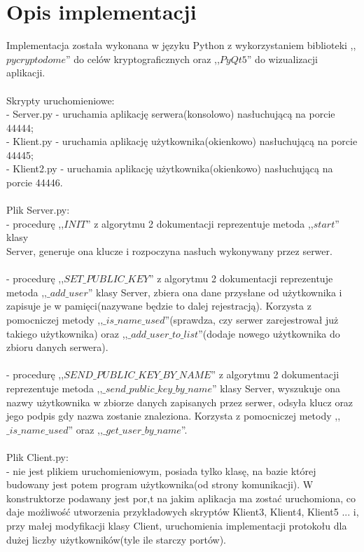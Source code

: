 \documentclass[11pt]{article}
\begin{document}
\clearpage
\section{Opis implementacji}
Implementacja została wykonana w języku Python z wykorzystaniem biblioteki ,,$pycryptodome$'' do celów kryptograficznych oraz ,,$PyQt5$'' do wizualizacji aplikacji.\\\\
Skrypty uruchomieniowe:\\
- Server.py - uruchamia aplikację serwera(konsolowo) nasłuchującą na porcie  44444;\\
- Klient.py - uruchamia aplikację użytkownika(okienkowo) nasłuchującą na porcie 44445;\\
- Klient2.py - uruchamia aplikację użytkownika(okienkowo) nasłuchującą na porcie 44446.\\
\\
Plik Server.py:\\
- procedurę ,,$INIT$'' z algorytmu 2 dokumentacji reprezentuje metoda ,,$start$'' klasy \\Server, generuje ona klucze i rozpoczyna nasłuch wykonywany przez serwer.\\\\
- procedurę ,,$SET\_PUBLIC\_KEY$'' z algorytmu 2 dokumentacji reprezentuje metoda ,,$\_add\_user$'' klasy Server, zbiera ona dane przysłane od użytkownika i zapisuje je w pamięci(nazywane będzie to dalej rejestracją). Korzysta z pomocniczej metody ,,$\_is\_name\_used$''(sprawdza, czy serwer zarejestrował już takiego użytkownika) oraz ,,$\_add\_user\_to\_list$''(dodaje nowego użytkownika do zbioru danych serwera).\\\\
- procedurę ,,$SEND\_PUBLIC\_KEY\_BY\_NAME$'' z algorytmu 2 dokumentacji reprezentuje metoda ,,$\_send\_public\_key\_by\_name$'' klasy Server, wyszukuje ona nazwy użytkownika w zbiorze danych zapisanych przez serwer, odsyła klucz oraz jego podpis gdy nazwa zostanie znaleziona. Korzysta z pomocniczej metody ,,$\_is\_name\_used$'' oraz ,,$\_get\_user\_by\_name$''.\\\\
Plik Client.py:\\
- nie jest plikiem uruchomieniowym, posiada tylko klasę, na bazie której budowany jest potem program użytkownika(od strony komunikacji). W konstruktorze podawany jest por,t na jakim aplikacja ma zostać uruchomiona, co daje możliwość utworzenia przykładowych skryptów Klient3, Klient4, Klient5 ... i, przy małej modyfikacji klasy Client, uruchomienia implementacji protokołu dla dużej liczby użytkowników(tyle ile starczy portów).\\\\
\end{document}
